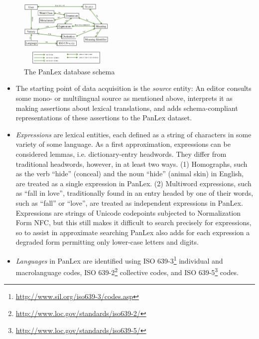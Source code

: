 \documentclass[sw]{iosart2c}
\begin{document}
\begin{figure}
  \centering
  \includegraphics[width=0.4\textwidth]{images/schema-new.png}
  \caption{The PanLex database schema}
  \label{fig:db-schema}
\end{figure}

\begin{itemize}
  \item The starting point of data acquisition is the \emph{source} entity: An editor consults some mono- or multilingual source as mentioned above, interprets it as making assertions about lexical translations, and adds schema-compliant representations of these assertions to the PanLex dataset.
  \item \emph{Expressions} are lexical entities, each defined as a string of characters in some variety of some language. As a first approximation, expressions can be considered lemmas, i.e. dictionary-entry headwords. They differ from traditional headwords, however, in at least two ways. (1) Homographs, such as the verb ``hide'' (conceal) and the noun ``hide'' (animal skin) in English, are treated as a single expression in PanLex. (2) Multiword expressions, such as ``fall in love'', traditionally found in an entry headed by one of their words, such as ``fall'' or ``love'', are treated as independent expressions in PanLex. Expressions are strings of Unicode codepoints subjected to Normalization Form NFC, but this still makes it difficult to search precisely for expressions, so to assist in approximate searching PanLex also adds for each expression a degraded form permitting only lower-case letters and digits.
    \item \emph{Languages} in PanLex are identified using ISO 639-3\footnote{\url{http://www.sil.org/iso639-3/codes.asp}} individual and macrolanguage codes, ISO 639-2\footnote{\url{http://www.loc.gov/standards/iso639-2/}} collective codes, and ISO 639-5\footnote{\url{http://www.loc.gov/standards/iso639-5/}} codes.

\end{itemize}
\end{document}
